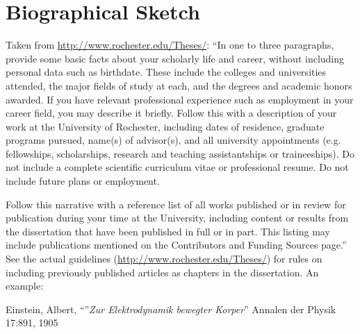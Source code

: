 \documentclass[\main/master.tex]{subfiles}
\begin{document}
\chapter*{Biographical Sketch}
\hspace{5 mm} Taken from \url{http://www.rochester.edu/Theses/}: ``In one to three paragraphs, provide some basic facts about your scholarly life and career, without including personal data such as birthdate. These include the colleges and universities attended, the major fields of study at each, and the degrees and academic honors awarded. If you have relevant professional experience such as employment in your career field, you may describe it briefly. Follow this with a description of your work at the University of Rochester, including dates of residence, graduate programs pursued, name(s) of advisor(s), and all university appointments (e.g. fellowships, scholarships, research and teaching assistantships or traineeships). Do not include a complete scientific curriculum vitae or professional resume. Do not include future plans or employment. \par
Follow this narrative with a reference list of all works published or in review for publication during your
time at the University, including content or results from the dissertation that have been published in full or in
part. This listing may include publications mentioned on the Contributors and Funding Sources page.'' See the actual guidelines (\url{http://www.rochester.edu/Theses/}) for rules on including previously published articles as chapters in the dissertation. \newline 
An example: \par
[1] Einstein, Albert, ``''\emph{Zur Elektrodynamik bewegter Korper}'' Annalen der Physik 17:891, 1905 \newline
\end{document}
